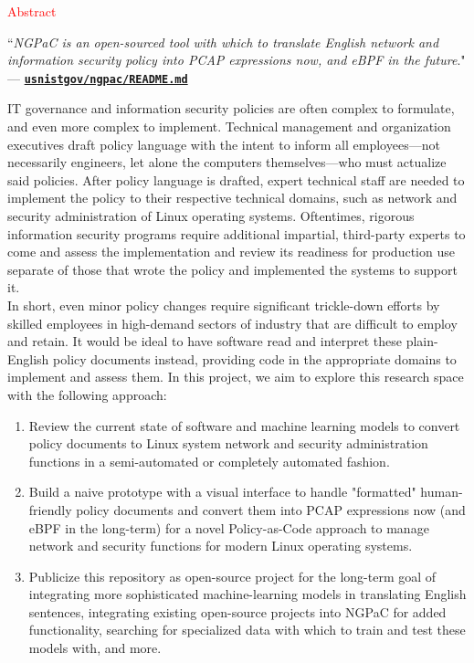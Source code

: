 \documentclass[11pt]{article}
\begin{document}
\begin{blackbox}{\begin{center}\LARGE\textcolor{red}{Abstract}\end{center}}
    \normalfont
    \begin{center}
        \large``\textit{NGPaC is an open-sourced tool with which to translate English network and information security policy into PCAP expressions now, and eBPF in the future}." \\
        --- \href{https://github.com/usnistgov/ngpac/tree/main}{\texttt{\textbf{usnistgov/ngpac/README.md}}}
    \end{center}
    
    \phantom{~~~~} IT governance and information security policies are often complex to formulate, and even more complex to implement. Technical management and organization executives draft policy language with the intent to inform all employees---not necessarily engineers, let alone the computers themselves---who must actualize said policies. After policy language is drafted, expert technical staff are needed to implement the policy to their respective technical domains, such as network and security administration of Linux operating systems. Oftentimes, rigorous information security programs require additional impartial, third-party experts to come and assess the implementation and review its readiness for production use separate of those that wrote the policy and implemented the systems to support it. \\

    \phantom{~~~~} In short, even minor policy changes require significant trickle-down efforts by skilled employees in high-demand sectors of industry that are difficult to employ and retain. It would be ideal to have software read and interpret these plain-English policy documents instead, providing code in the appropriate domains to implement and assess them. In this project, we aim to explore this research space with the following approach:

    \begin{enumerate}
        \item Review the current state of software and machine learning models to convert policy documents to Linux system network and security administration functions in a semi-automated or completely automated fashion.

        \item Build a naive prototype with a visual interface to handle "formatted" human-friendly policy documents and convert them into PCAP expressions now (and eBPF in the long-term) for a novel Policy-as-Code approach to manage network and security functions for modern Linux operating systems.

        \item Publicize this repository as open-source project for the long-term goal of integrating more sophisticated machine-learning models in translating English sentences, integrating existing open-source projects into NGPaC for added functionality, searching for specialized data with which to train and test these models with, and more.
    \end{enumerate}
\end{blackbox}
\end{document}
